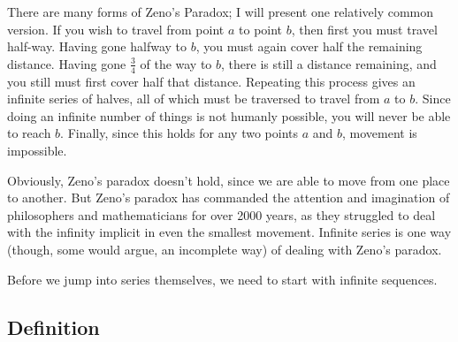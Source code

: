\documentclass[fleqn]{report}
\begin{document}
There are many forms of Zeno's Paradox; I will present one 
relatively common version. If you wish to travel from point
$a$ to point $b$, then first you must travel half-way. Having
gone halfway to $b$, you must again cover half the remaining
distance. Having gone $\frac{3}{4}$ of the way to $b$, there
is still a distance remaining, and you still must first cover
half that distance. Repeating this process gives an infinite
series of halves, all of which must be traversed to travel
from $a$ to $b$. Since doing an infinite number of things is
not humanly possible, you will never be able to reach $b$.
Finally, since this holds for any two points $a$ and $b$,
movement is impossible. 

Obviously, Zeno's paradox doesn't hold, since we are able to
move from one place to another. But Zeno's paradox has
commanded the attention and imagination of philosophers and
mathematicians for over 2000 years, as they struggled to deal
with the infinity implicit in even the smallest movement.
Infinite series is one way (though, some would argue, an
incomplete way) of dealing with Zeno's paradox.

Before we jump into series themselves, we need to start with
infinite sequences.

\subsection{Definition}
\label{sequences-definition}
\end{document}
